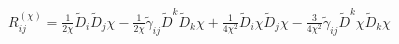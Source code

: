 $R_{ij}^{(\chi)} = \frac{1}{2\chi} \tilde{D}_i \tilde{D}_j \chi 
    - \frac{1}{2\chi} \tilde{\gamma}_{ij} \tilde{D}^k \tilde{D}_k \chi 
    + \frac{1}{4\chi^2} \tilde{D}_i \chi \tilde{D}_j \chi 
    - \frac{3}{4\chi^2} \tilde{\gamma}_{ij} \tilde{D}^k \chi \tilde{D}_k \chi$
